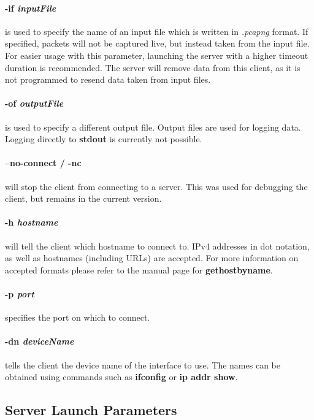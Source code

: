 \paragraph{-if \textit{inputFile}} is  used to specify the name of an input file which is written in \textit{.pcapng} format.
If specified, packets will not be captured live, but instead taken from the input file.
For easier usage with this parameter, launching the server with a higher timeout duration is recommended.
The server will remove data from this client, as it is not programmed to resend data taken from input files.

\paragraph{-of \textit{outputFile}} is used to specify a different output file.
Output files are used for logging data.
Logging directly to \textbf{stdout} is currently not possible.

\paragraph{--no-connect / -nc} will stop the client from connecting to a server.
This was used for debugging the client, but remains in the current version.

\paragraph{-h \textit{hostname}} will tell the client which hostname to connect to.
IPv4 addresses in dot notation, as well as hostnames (including URLs) are accepted.
For more information on accepted formats please refer to the manual page for \textbf{gethostbyname}.

\paragraph{-p \textit{port}} specifies the port on which to connect.

\paragraph{-dn \textit{deviceName}} tells the client the device name of the interface to use.
The names can be obtained using commands such as \textbf{ifconfig} or \textbf{ip addr show}.

\subsection*{Server Launch Parameters}
